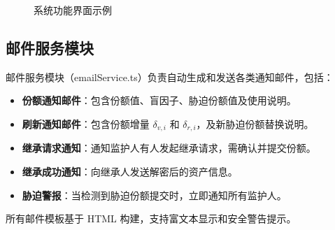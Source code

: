 \begin{figure}[H]
    \centering
    \vspace{3em}
    \vspace{1em}
    \caption{系统功能界面示例}
    \label{fig:screenshots}
\end{figure}

\subsection{邮件服务模块}

邮件服务模块（emailService.ts）负责自动生成和发送各类通知邮件，包括：

\begin{itemize}
    \item \textbf{份额通知邮件}：包含份额值、盲因子、胁迫份额值及使用说明。
    \item \textbf{刷新通知邮件}：包含份额增量 $\delta_{v,i}$ 和 $\delta_{r,i}$，及新胁迫份额替换说明。
    \item \textbf{继承请求通知}：通知监护人有人发起继承请求，需确认并提交份额。
    \item \textbf{继承成功通知}：向继承人发送解密后的资产信息。
    \item \textbf{胁迫警报}：当检测到胁迫份额提交时，立即通知所有监护人。
\end{itemize}

所有邮件模板基于 HTML 构建，支持富文本显示和安全警告提示。
